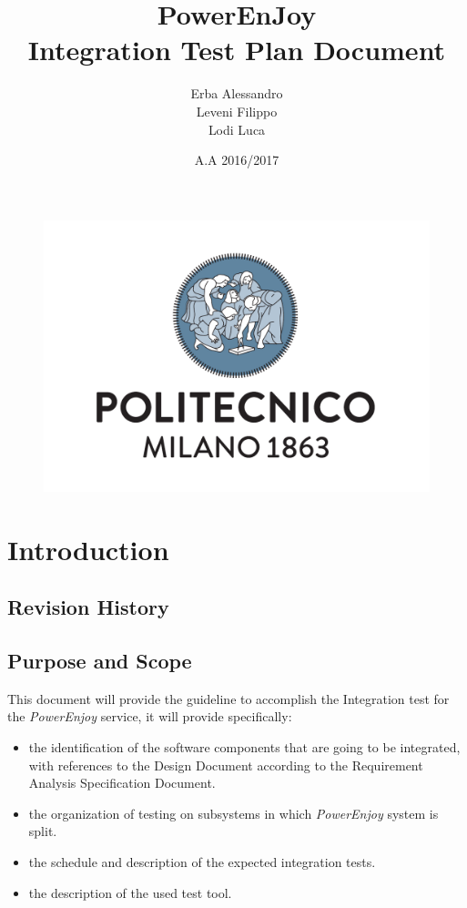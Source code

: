 \documentclass[english]{article}
\newcommand{\powerenjoy}{\textit{PowerEnjoy }}
\begin{document}
	\begin{figure}
		\centering
		\includegraphics[scale=0.5]{logo.pdf} 
	\end{figure}


	\title{PowerEnJoy\\
	Integration Test Plan Document\\
	}

	\date{A.A 2016/2017}
	
	\author{Erba Alessandro\\
	 Leveni Filippo\\
	 Lodi Luca}
	
	\maketitle
	\pagebreak{}
	\tableofcontents{} \pagebreak{}
\section{Introduction}
	\subsection{Revision History}
	
	\subsection{Purpose and Scope}
	This document will provide the guideline to accomplish the Integration test for the \powerenjoy service, it will provide specifically:
	\begin{itemize}
		\item the identification of the software components that are going to be integrated, with references to the Design Document according to the Requirement Analysis Specification Document.
		\item the organization of testing on subsystems in which \powerenjoy system is split.
		\item the schedule and description of the expected integration tests.
		\item the description of the used test tool.
	\end{itemize}
\end{document}
